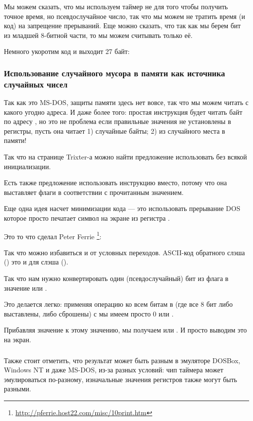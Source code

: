 Мы можем сказать, что мы используем таймер не для того чтобы получить точное время, но псевдослучайное число,
так что мы можем не тратить время (и код) на запрещение прерываний.
Еще можно сказать, что так как мы берем бит из младшей 8-битной части, то мы можем считывать только её.

Немного укоротим код и выходит 27 байт:



\subsubsection{Использование случайного мусора в памяти как источника случайных чисел}

Так как это MS-DOS, защиты памяти здесь нет вовсе, так что мы можем читать с какого
угодно адреса.
И даже более того: простая инструкция  
будет читать байт по адресу , но это не проблема
если правильные значения не установлены в регистры, пусть она читает 1) случайные байты; 2) из случайного
места в памяти!

Так что на странице Trixter-а\FNURLTRIXTER 
можно найти предложение использовать  без всякой инициализации.

Есть также предложение использовать инструкцию  
вместо, потому что она выставляет флаги в соответствии с прочитанным значением.

Еще одна идея насчет минимизации кода --- это использовать прерывание DOS
  которое просто печатает символ на экране
из регистра .

Это то что сделал Peter Ferrie
\footnote{\url{http://pferrie.host22.com/misc/10print.htm}}:



Так что можно избавиться и от условных переходов.
\ac{ASCII}-код обратного слэша (\q{\textbackslash{}}) 
это  и  для слэша (\q{/}).

Так что нам нужно конвертировать один (псевдослучайный) бит из флага  в значение  или .

Это делается легко: применяя операцию  ко всем битам в  (где все 8 бит либо выставлены, либо сброшены) с  мы имеем просто 0 или .

Прибавляя значение  к этому значению, мы получаем  или .
И просто выводим это на экран.

\subsubsection{\Conclusion{}}

Также стоит отметить, что результат может быть разным в эмуляторе DOSBox, \gls{Windows NT} и даже MS-DOS, 
из-за разных условий:
чип таймера может эмулироваться по-разному, изначальные значения регистров также могут быть разными.
